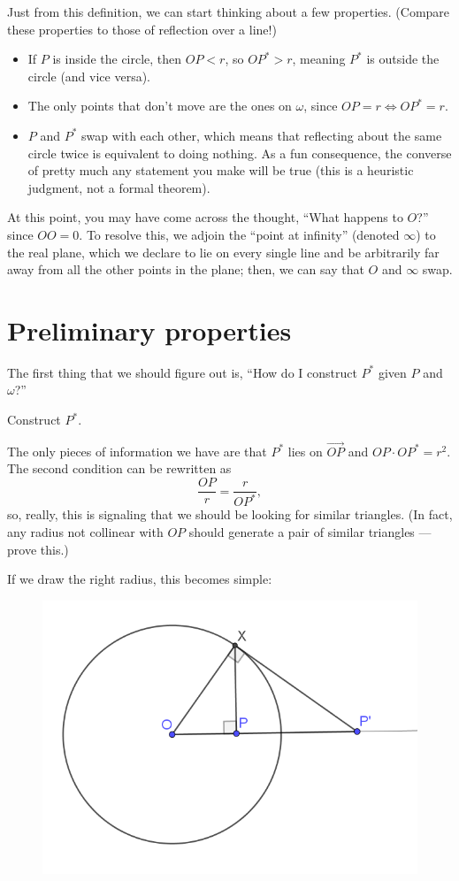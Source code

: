 \documentclass{scrartcl}
\providecommand{\ii}{\item}
\begin{document}
Just from this definition, we can start thinking about a few properties.
(Compare these properties to those of reflection over a line!)

\begin{itemize}
	\ii If $P$ is inside the circle, then $OP < r$, so $OP^\ast > r$,
	meaning $P^\ast$ is outside the circle (and vice versa).
	\ii The only points that don't move are the ones on $\omega$,
	since $OP = r \iff OP^\ast = r$.
	\ii $P$ and $P^\ast$ swap with each other, which means that
	reflecting about the same circle twice is equivalent to
	doing nothing. As a fun consequence, the converse of
	pretty much any statement you make will be true
	(this is a heuristic judgment, not a formal theorem).
\end{itemize}

At this point, you may have come across the thought, ``What happens to $O$?''
since $OO = 0$. To resolve this, we adjoin the ``point at infinity''
(denoted $\infty$) to the real plane, which we declare
to lie on every single line and be arbitrarily far away
from all the other points in the plane; then, we can say that
$O$ and $\infty$ swap.

\section{Preliminary properties}

The first thing that we should figure out is,
``How do I construct $P^\ast$ given $P$ and $\omega$?''
\begin{problem}
	Construct $P^\ast$.
\end{problem}

The only pieces of information we have are that $P^\ast$ lies on 
$\overrightarrow{OP}$ and $OP\cdot OP^\ast = r^2$.
The second condition can be rewritten as
\[\frac{OP}{r} = \frac{r}{OP^\ast},\]
so, really, this is signaling that we should be looking for similar triangles.
(In fact, any radius not collinear with $OP$ should generate
a pair of similar triangles --- prove this.)

If we draw the right radius, this becomes simple:

\begin{figure}[h]
	\centering
	\includegraphics[width=0.7\linewidth]{inversion_construct}
	\label{fig:inversionconstruct}
\end{figure}
\end{document}
